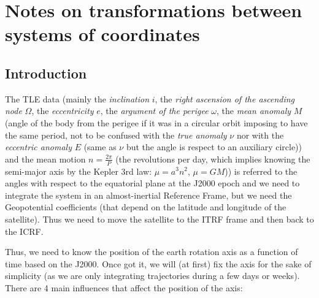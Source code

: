 \documentclass[10pt,a4paper]{article}
\theoremstyle{definition}
\begin{document}
\section{Notes on transformations between systems of coordinates}
\subsection{Introduction}
The TLE data (mainly the \emph{inclination} $i$, the \emph{right ascension of the ascending node} $\Omega$, the \emph{eccentricity} $e$, the \emph{argument of the perigee} $\omega$, the \emph{mean anomaly} $M$ (angle of the body from the perigee if it was in a circular orbit imposing to have the same period, not to be confused with the \emph{true anomaly} $\nu$ nor with the \emph{eccentric anomaly} $E$ (same as $\nu$ but the angle is respect to an auxiliary circle)) and the mean motion $n=\frac{2\pi}{P}$ (the revolutions per day, which implies knowing the semi-major axis by the Kepler 3rd law: $\mu=a^3n^2$, $\mu=GM$)) is referred to the angles with respect to the equatorial plane at the J2000 epoch and we need to integrate the system in an almost-inertial Reference Frame, but we need the Geopotential coefficients (that depend on the latitude and longitude of the satellite). Thus we need to move the satellite to the ITRF frame and then back to the ICRF.

Thus, we need to know the position of the earth rotation axis as a function of time based on the J2000. Once got it, we will (at first) fix the axis for the sake of simplicity (as we are only integrating trajectories during a few days or weeks). There are 4 main influences that affect the position of the axis:
\end{document}

